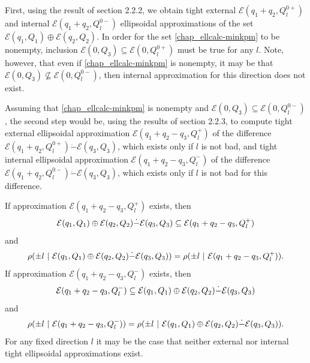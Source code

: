 \documentclass[letterpaper,10pt,english]{sphinxmanual}
\begin{document}
First, using the result of section 2.2.2, we obtain tight external
\({\mathcal E}(q_1+q_2,Q_l^{0+})\) and internal
\({\mathcal E}(q_1+q_2,Q_l^{0-})\) ellipsoidal approximations of the
set \({\mathcal E}(q_1,Q_1)\oplus{\mathcal E}(q_2,Q_2)\). In order
for the set \eqref{chap_ellcalc-minkpm} to be nonempty, inclusion
\({\mathcal E}(0,Q_3)\subseteq{\mathcal E}(0,Q_l^{0+})\) must be
true for any \(l\). Note, however, that even if \eqref{chap_ellcalc-minkpm} is
nonempty, it may be that
\({\mathcal E}(0,Q_3)\not\subseteq{\mathcal E}(0,Q_l^{0-})\), then
internal approximation for this direction does not exist.

Assuming that \eqref{chap_ellcalc-minkpm} is nonempty and
\({\mathcal E}(0,Q_3)\subseteq{\mathcal E}(0,Q_l^{0-})\), the second
step would be, using the results of section 2.2.3, to compute tight
external ellipsoidal approximation
\({\mathcal E}(q_1+q_2-q_3,Q_l^+)\) of the difference
\({\mathcal E}(q_1+q_2,Q_l^{0+})\dot{-}{\mathcal E}(q_3,Q_3)\),
which exists only if \(l\) is not bad, and tight internal
ellipsoidal approximation \({\mathcal E}(q_1+q_2-q_3,Q_l^-)\) of the
difference
\({\mathcal E}(q_1+q_2,Q_l^{0-})\dot{-}{\mathcal E}(q_3,Q_3)\),
which exists only if \(l\) is not bad for this difference.

If approximation \({\mathcal E}(q_1+q_2-q_3,Q_l^+)\) exists, then
\begin{gather}
\begin{split}{\mathcal E}(q_1,Q_1)\oplus{\mathcal E}(q_2,Q_2)\dot{-}{\mathcal E}(q_3,Q_3) \subseteq
{\mathcal E}(q_1+q_2-q_3,Q_l^+)\end{split}\notag
\end{gather}
and
\begin{gather}
\begin{split}\rho(\pm l ~|~ {\mathcal E}(q_1,Q_1)\oplus{\mathcal E}(q_2,Q_2)\dot{-}{\mathcal E}(q_3,Q_3)) =
\rho(\pm l ~|~ {\mathcal E}(q_1+q_2-q_3,Q_l^+)).\end{split}\notag
\end{gather}
If approximation \({\mathcal E}(q_1+q_2-q_3,Q_l^-)\) exists, then
\begin{gather}
\begin{split}{\mathcal E}(q_1+q_2-q_3,Q_l^-) \subseteq
{\mathcal E}(q_1,Q_1)\oplus{\mathcal E}(q_2,Q_2)\dot{-}{\mathcal E}(q_3,Q_3)\end{split}\notag
\end{gather}
and
\begin{gather}
\begin{split}\rho(\pm l ~|~{\mathcal E}(q_1+q_2-q_3,Q_l^-)) =
\rho(\pm l ~|~ {\mathcal E}(q_1,Q_1)\oplus{\mathcal E}(q_2,Q_2)\dot{-}{\mathcal E}(q_3,Q_3)) .\end{split}\notag
\end{gather}
For any fixed direction \(l\) it may be the case that neither
external nor internal tight ellipsoidal approximations exist.
\end{document}
